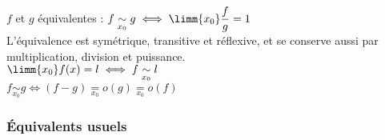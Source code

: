 $f$ et $g$ équivalentes : $f \underset{x_0}{\sim} g \iff \limm{x_0} \dfrac{f}{g} = 1$\\
L'équivalence est symétrique, transitive et réflexive, et se conserve aussi par multiplication, division et puissance.\\

$\limm{x_0} f(x) = l \iff f \underset{x_0}{\sim} l$\\
$f \underset{x_0}{\sim} g \iff (f - g) \underset{x_0}{=} o(g) \underset{x_0}{=} o(f)$

\subsubsection{Équivalents usuels}

